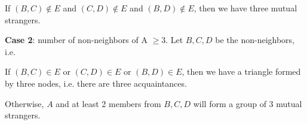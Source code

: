 \begin{eg}
  If \((B, C) \notin E\) and \((C, D) \notin E\) and \((B, D) \notin E\), then we have three mutual strangers. 

  \textbf{Case 2}: number of non-neighbors of A \(\geq 3\). Let \(B, C, D\) be the non-neighbors, i.e. 
  \begin{figure}[H]
    \centering
  \end{figure}

  If \((B, C) \in E\) or \((C, D) \in E\) or \((B, D) \in E\), then we have a triangle formed by three nodes, i.e. there are three acquaintances. 

  Otherwise, \(A\) and at least 2 members from \(B, C, D\) will form a group of 3 mutual strangers.
\end{eg}